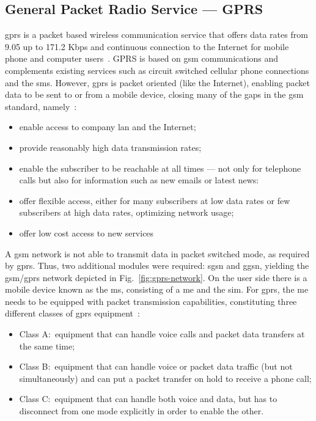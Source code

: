 \subsection{General Packet Radio Service --- GPRS}%
\label{sec:gprs}
\gls{gprs} is a packet based wireless communication service that offers data
rates from 9.05 up to 171.2 Kbps and continuous connection to the Internet for
mobile phone and computer users~\cite{sanders2003gprs}.
GPRS is based on \gls{gsm} communications and complements existing services such
as circuit switched cellular phone connections and the \gls{sms}.
However, \gls{gprs} is packet oriented (like the Internet), enabling packet data
to be sent to or from a mobile device, closing many of the gaps in the \gls{gsm}
standard, namely~\cite{sanders2003gprs}:
\begin{itemize}
\item enable access to company \gls{lan} and the Internet;
\item provide reasonably high data transmission rates;
\item enable the subscriber to be reachable at all times --- not only for
  telephone calls but also for information such as new emails or latest news:
\item offer flexible access, either for many subscribers at low data rates or
  few subscribers at high data rates, optimizing network usage;
\item offer low cost access to new services
\end{itemize}
A \gls{gsm} network is not able to transmit data in packet switched mode, as
required by \gls{gprs}. Thus, two additional modules were required: \gls{sgsn}
and \gls{ggsn}, yielding the \gls{gsm}/\gls{gprs} network depicted in Fig.~\ref{fig:gprs-network}.
On the user side there is a mobile device known as the \gls{ms}, consisting of a
\gls{me} and the \gls{sim}. For \gls{gprs}, the \gls{me} needs to be equipped
with packet transmission capabilities, constituting three different classes of
\gls{gprs} equipment~\cite{sanders2003gprs}:
\begin{itemize}
\item Class A:~equipment that can handle voice calls and packet data transfers
  at the same time;
\item Class B:~equipment that can handle voice or packet data traffic (but not
  simultaneously) and can put a packet transfer on hold to receive a phone call;
\item Class C:~equipment that can handle both voice and data, but has to
  disconnect from one mode explicitly in order to enable the other.
\end{itemize}
